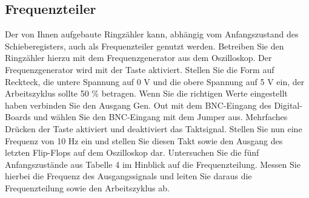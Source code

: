 \documentclass[10pt]{scrreprt}
\begin{document}
    \subsection{Frequenzteiler}
    Der von Ihnen aufgebaute Ringzähler kann, abhängig vom Anfangszustand des Schieberegisters,
    auch als Frequenzteiler genutzt werden. Betreiben Sie den Ringzähler hierzu
    mit dem Frequenzgenerator aus dem Oszilloskop. Der Frequenzgenerator wird mit der
    Taste  aktiviert. Stellen Sie die Form auf Reckteck, die untere Spannung auf
    0 V und die obere Spannung auf 5 V ein, der Arbeitszyklus sollte 50 \% betragen.
    Wenn Sie die richtigen Werte eingestellt haben verbinden Sie den Ausgang Gen. Out
    mit dem BNC-Eingang des Digital-Boards und wählen Sie den BNC-Eingang mit dem
    Jumper aus. Mehrfaches Drücken der Taste  aktiviert und deaktiviert das
    Taktsignal. Stellen Sie nun eine Frequenz von 10 Hz ein und stellen Sie diesen Takt sowie
    den Ausgang des letzten Flip-Flops auf dem Oszilloskop dar. Untersuchen Sie die fünf
    Anfangszustände aus Tabelle 4 im Hinblick auf die Frequenzteilung. Messen Sie hierbei
    die Frequenz des Ausgangssignals und leiten Sie daraus die Frequenzteilung sowie den
    Arbeitszyklus ab.
\end{document}
